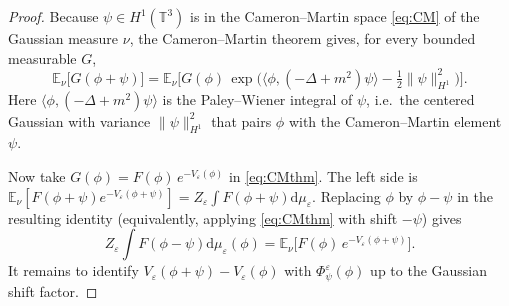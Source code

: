 \documentclass[12pt]{article}
\theoremstyle{definition}
\newcommand{\T}{\mathbb{T}^3}
\newcommand{\E}{\mathbb{E}}
\newcommand{\dd}{\mathrm{d}}
\begin{document}
\begin{proof}
Because $\psi\in H^1(\T)$ is in the Cameron--Martin space \eqref{eq:CM} of the Gaussian
measure $\nu$, the Cameron--Martin theorem gives, for every bounded measurable $G$,
\begin{equation}\label{eq:CMthm}
  \E_\nu\big[G(\phi+\psi)\big]
  =\E_\nu\Big[G(\phi)\,\exp\!\big(\langle\phi,(-\Delta+m^2)\psi\rangle-\tfrac12\|\psi\|_{H^1}^2\big)\Big].
\end{equation}
Here $\langle\phi,(-\Delta+m^2)\psi\rangle$ is the Paley--Wiener integral of $\psi$,
i.e.\ the centered Gaussian with variance $\|\psi\|_{H^1}^2$ that pairs $\phi$ with the
Cameron--Martin element $\psi$.

Now take $G(\phi)=F(\phi)\,e^{-V_\varepsilon(\phi)}$ in \eqref{eq:CMthm}. The left side is
$\E_\nu[F(\phi+\psi)e^{-V_\varepsilon(\phi+\psi)}]=Z_\varepsilon\int F(\phi+\psi)\dd\mu_\varepsilon$.
Replacing $\phi$ by $\phi-\psi$ in the resulting identity (equivalently, applying
\eqref{eq:CMthm} with shift $-\psi$) gives
\begin{equation}\label{eq:step1}
  Z_\varepsilon\!\int\! F(\phi-\psi)\dd\mu_\varepsilon(\phi)
  =\E_\nu\Big[F(\phi)\,e^{-V_\varepsilon(\phi+\psi)}\Big].
\end{equation}
It remains to identify $V_\varepsilon(\phi+\psi)-V_\varepsilon(\phi)$ with
$\Phi_\psi^\varepsilon(\phi)$ up to the Gaussian shift factor.


\end{proof}
\end{document}
